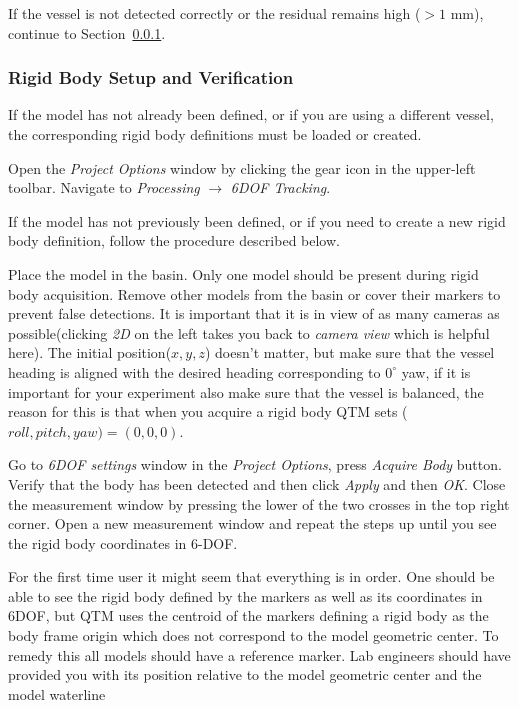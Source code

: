 \documentclass[12pt,a4paper]{article}
\begin{document}
If the vessel is not detected correctly or the residual remains high ($>1$ mm), continue to Section~\ref{sec:rigidbody}.

\subsubsection{Rigid Body Setup and Verification}
\label{sec:rigidbody}

If the model has not already been defined, or if you are using a different vessel, the corresponding rigid body definitions must be loaded or created.

Open the \textit{Project Options} window by clicking the gear icon in the upper-left toolbar. Navigate to \textit{Processing} $\rightarrow$ \textit{6DOF Tracking}.



If the model has not previously been defined, or if you need to create a new rigid body definition, follow the procedure described below.


Place the model in the basin. Only one model should be present during rigid body acquisition. Remove other models from the basin or cover their markers to prevent false detections. It is important that it is in view of as many cameras as possible(clicking \textit{2D} on the left takes you back to \textit{camera view} which is helpful here). The initial position($x,y,z$) doesn't matter, but make sure that the vessel heading is aligned with the desired heading corresponding to $0^\circ$ yaw, if it is important for your experiment also make sure that the vessel is balanced, the reason for this is that when you acquire a rigid body QTM sets ($roll, pitch,yaw)=(0,0,0)$. 

Go to \textit{6DOF settings} window in the \textit{Project Options}, press \textit{Acquire Body} button. Verify that the body has been detected and then click \textit{Apply} and then \textit{OK}. Close the measurement window by pressing the lower of the two crosses in the top right corner. Open a new measurement window and repeat the steps up until you see the rigid body coordinates in 6-DOF. 

For the first time user it might seem that everything is in order. One should be able to see the rigid body defined by the markers as well as its coordinates in 6DOF, but QTM uses the centroid of the markers defining a rigid body as the body frame origin which does not correspond to the model geometric center. To remedy this all  models should have a reference marker. Lab engineers should have provided you with its position relative to the model geometric center and the model waterline 
\end{document}
